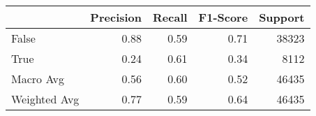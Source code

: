 \begin{tabular}{lrrrr}
\toprule
             &  Precision &  Recall &  F1-Score &  Support \\
\midrule
       False &       0.88 &    0.59 &      0.71 &    38323 \\
        True &       0.24 &    0.61 &      0.34 &     8112 \\
   Macro Avg &       0.56 &    0.60 &      0.52 &    46435 \\
Weighted Avg &       0.77 &    0.59 &      0.64 &    46435 \\
\bottomrule
\end{tabular}
